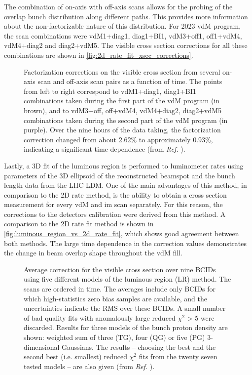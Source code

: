 The combination of on-axis with off-axis scans allows for the probing of the overlap bunch distribution along different paths. This provides more information about the non-factorizable nature of this distribution. For 2023 vdM program, the scan combinations were vdM1+diag1, diag1+BI1, vdM3+off1, off1+vdM4, vdM4+diag2 and diag2+vdM5. The visible cross section corrections for all these combinations are shown in \autoref{fig:2d_rate_fit_xsec_corrections}.

\begin{figure}[!htb]
	\centering
	\caption[Factorization corrections on visible cross section from 2D rate fit method]{Factorization corrections on the visible cross section from several on-axis scan and off-axis scan pairs as a function of time. The points from left to right correspond to vdM1+diag1, diag1+BI1 combinations taken during the first part of the vdM program (in brown), and to vdM3+off, off+vdM4, vdM4+diag2, diag2+vdM5 combinations taken during the second part of the vdM program (in purple). Over the nine hours of the data taking, the factorization correction changed from about 2.62\% to approximately 0.93\%, indicating a significant time dependence (from \textit{Ref.} \cite{CMS-DP-2024-068}).}
	\label{fig:2d_rate_fit_xsec_corrections}
\end{figure}

Lastly, a 3D fit of the luminous region is performed to luminometer rates using parameters of the 3D ellipsoid of the reconstructed beamspot and the bunch length data from the LHC LDM. One of the main advantages of this method, in comparison to the 2D rate method, is the ability to obtain a cross section measurement for every vdM and im scan separately. For this reason, the corrections to the detectors calibration were derived from this method. A comparison to the 2D rate fit method is shown in \autoref{fig:luminous_region_vs_2d_rate_fit}, which shows good agreement between both methods. The large time dependence in the correction values demonstrates the change in beam overlap shape throughout the vdM fill.

\begin{figure}[!htb]
	\centering
	\caption[Factorization corrections on visible cross section from luminous region method.]{Average correction for the visible cross section over nine BCIDs using five different models of the luminous region (LR) method. The scans are ordered in time. The averages include only BCIDs for which high-statistics zero bias samples are available, and the uncertainties indicate the RMS over these BCIDs. A small number of bad quality fits with anomalously large reduced $\chi^2$ > 5 were discarded. Results for three models of the bunch proton density are shown: weighted sum of three (TG), four (QG) or five (PG) 3-dimensional Gaussians. The results – choosing the best and the second best (i.e. smallest) reduced $\chi^2$ fits from the twenty seven tested models – are also given (from \textit{Ref.} \cite{CMS-DP-2024-068}).}
	\label{fig:luminous_region_vs_2d_rate_fit}
\end{figure}

